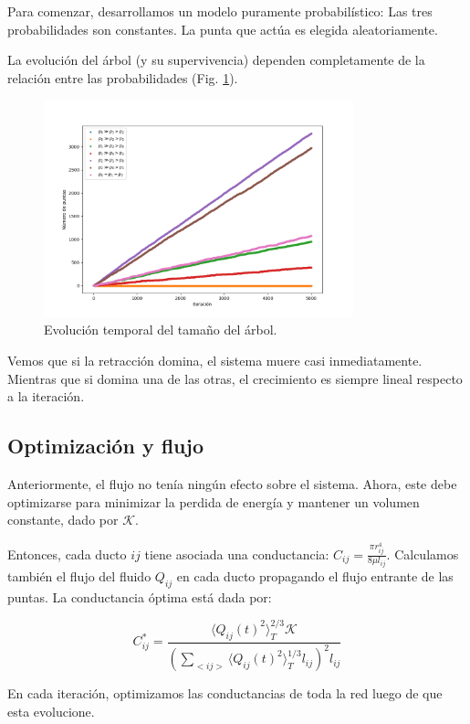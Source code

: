 \documentclass{article}
\begin{document}
Para comenzar, desarrollamos un modelo puramente probabilístico: Las tres probabilidades son constantes. La punta que actúa es elegida aleatoriamente.

La evolución del árbol (y su supervivencia) dependen completamente de la relación entre las probabilidades (Fig. \ref{fig:evolucion_tamano_proba}). 

\begin{figure}[h!]
    \centering
    \includegraphics[width=0.8\textwidth]{graficos_proba/N(t)_comparado.png}
    \caption{Evolución temporal del tamaño del árbol.}
    \label{fig:evolucion_tamano_proba}
\end{figure}

Vemos que si la retracción domina, el sistema muere casi inmediatamente. Mientras que si domina una de las otras, el crecimiento es siempre lineal respecto a la iteración.

\subsection{Optimización y flujo}

Anteriormente, el flujo no tenía ningún efecto sobre el sistema. Ahora, este debe optimizarse para minimizar la perdida de energía y mantener un volumen constante, dado por $\mathcal{K}$.

Entonces, cada ducto $ij$ tiene asociada una conductancia: $C_{ij} = \frac{\pi r_{ij}^4}{8\mu l_{ij}}$. Calculamos también el flujo del fluido $Q_{ij}$ en cada ducto propagando el flujo entrante de las puntas. La conductancia óptima está dada por:

$$ C_{ij}^* = \frac{\langle Q_{ij}(t)^2\rangle_T^{2/3} \mathcal{K}}{\left( \sum_{<ij>} \langle Q_{ij}(t)^2\rangle_T^{1/3} l_{ij}\right)^2 l_{ij}} $$

En cada iteración, optimizamos las conductancias de toda la red luego de que esta evolucione.
\end{document}
